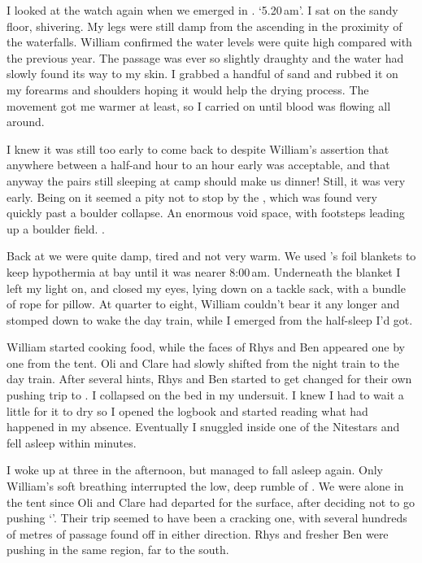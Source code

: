 I looked at the watch again when we emerged in . `5.20\,am'. I sat on the sandy floor, shivering. My legs were still damp from the ascending in the proximity of the waterfalls. William confirmed the water levels were quite high compared with the previous year. The passage was ever so slightly draughty and the water had slowly found its way to my skin. I grabbed a handful of sand and rubbed it on my forearms and shoulders hoping it would help the drying process. The movement got me warmer at least, so I carried on until blood was flowing all around.

I knew it was still too early to come back to  despite William's assertion that anywhere between a half-and hour to an hour early was acceptable, and that anyway the pairs still sleeping at camp should make us dinner! Still, it was very early. Being on  it seemed a pity not to stop by the , which was found very quickly past a boulder collapse. An enormous void space, with footsteps leading up a boulder field. .

Back at  we were quite damp, tired and not very warm. We used 's foil blankets to keep hypothermia at bay until it was nearer 8:00\,am. Underneath the blanket I left my light on, and closed my eyes, lying down on a tackle sack, with a bundle of rope for pillow. At quarter to eight, William couldn't bear it any longer and stomped down  to wake the day train, while I emerged from the half-sleep I'd got.

William started cooking food, while the faces of Rhys and Ben appeared one by one from the tent. Oli and Clare had slowly shifted from the night train to the day train. After several hints, Rhys and Ben started to get changed for their own pushing trip to . I collapsed on the bed in my undersuit. I knew I had to wait a little for it to dry so I opened the logbook and started reading what had happened in my absence. Eventually I snuggled inside one of the Nitestars and fell asleep within minutes.

I woke up at three in the afternoon, but managed to fall asleep again. Only William's soft breathing interrupted the low, deep rumble of . We were alone in the tent since Oli and Clare had departed for the surface, after deciding not to go pushing `'. Their trip seemed to have been a cracking one, with several hundreds of metres of passage found off  in either direction. Rhys and fresher Ben were pushing in the same region, far to the south.

